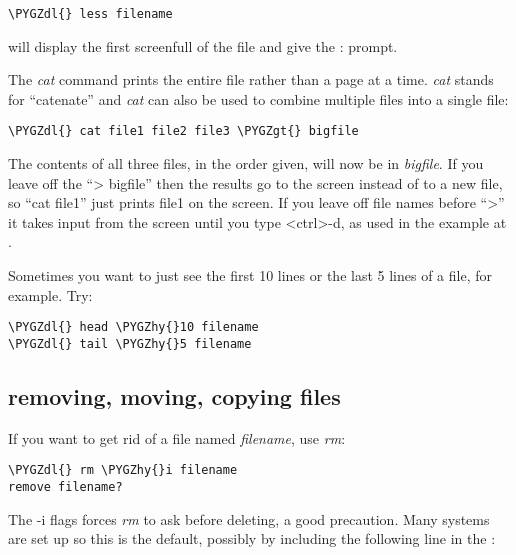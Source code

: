 \documentclass[letterpaper,10pt,english]{sphinxmanual}
\def\PYGZgt{\char`\>}
\def\PYGZdl{\char`\$}
\def\PYGZhy{\char`\-}
\begin{document}
\begin{Verbatim}[commandchars=\\\{\}]
\PYGZdl{} less filename
\end{Verbatim}

will display the first screenfull of the file and give the : prompt.

The \emph{cat} command prints the entire file rather than a page at a time.
\emph{cat} stands for ``catenate'' and \emph{cat} can also be used to combine multiple
files into a single file:

\begin{Verbatim}[commandchars=\\\{\}]
\PYGZdl{} cat file1 file2 file3 \PYGZgt{} bigfile
\end{Verbatim}

The contents of all three files, in the order given, will now be in
\emph{bigfile}.  If you leave off the ``\textgreater{} bigfile'' then the results go to the
screen instead of to a new file, so ``cat file1'' just prints file1 on the
screen.  If you leave off file names before ``\textgreater{}'' it takes input from the
screen until you type \textless{}ctrl\textgreater{}-d, as used in the example at .

Sometimes you want to just see the first 10 lines or the last 5 lines of a
file, for example.  Try:

\begin{Verbatim}[commandchars=\\\{\}]
\PYGZdl{} head \PYGZhy{}10 filename
\PYGZdl{} tail \PYGZhy{}5 filename
\end{Verbatim}


\subsection{removing, moving, copying files}
\label{unix:removing-moving-copying-files}
If you want to get rid of a file named \emph{filename}, use \emph{rm}:

\begin{Verbatim}[commandchars=\\\{\}]
\PYGZdl{} rm \PYGZhy{}i filename
remove filename?
\end{Verbatim}

The -i flags forces \emph{rm} to ask before deleting, a good precaution.  Many
systems are set up so this is the default, possibly by including the
following line in the {\hyperref[unix:bashrc]{}}:
\end{document}
